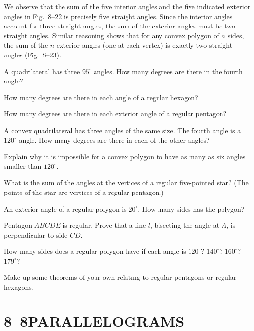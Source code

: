 \documentclass[11pt]{book}
\theoremstyle{bkplain}
\theoremstyle{XIplainnote}
\theoremstyle{bkplain}
\theoremstyle{bkplain}
\begin{document}
We observe that the sum of the five interior angles and the five indicated
exterior angles in Fig.~8--22 is precisely five straight angles. Since the
interior angles account for three straight angles, the sum of the exterior
angles must be two straight angles. Similar reasoning shows that for any
convex polygon of $n$ sides, the sum of the $n$ exterior angles (one at each
vertex) is exactly two straight angles (Fig.~8--23).

\begin{exercisecols}
\begin{exlist}
\item A quadrilateral has three $95^\circ$ angles. How many degrees are there
  in the fourth angle?
\item How many degrees are there in each angle of a regular hexagon?
\item How many degrees are there in each exterior angle of a regular pentagon?
\item A convex quadrilateral has three angles of the same size. The fourth
  angle is a $120^\circ$ angle. How many degrees are there in each of the
  other angles?
\item Explain why it is impossible for a convex polygon to have as many as six
  angles smaller than $120^\circ$.
\item[\stex 6.] What is the sum of the angles at the vertices of a regular
  five-pointed star? (The points of the star are vertices of a regular
  pentagon.)
\exfig{\FIGVIIITWENTYFOUR}
\item[7.] An exterior angle of a regular polygon is $20^\circ$. How many sides
  has the polygon?
\item[8.] Pentagon $ABCDE$ is regular. Prove that a line $l$, bisecting the
  angle at $A$, is perpendicular to side $CD$.
\item[9.] How many sides does a regular polygon have if each angle is
  $120^\circ$? $140^\circ$? $160^\circ$? $179^\circ$?
\item[10.] Make up some theorems of your own relating to regular pentagons or
  regular hexagons.
\end{exlist}
\end{exercisecols}

\section*{8--8\quad PARALLELOGRAMS}
\end{document}
